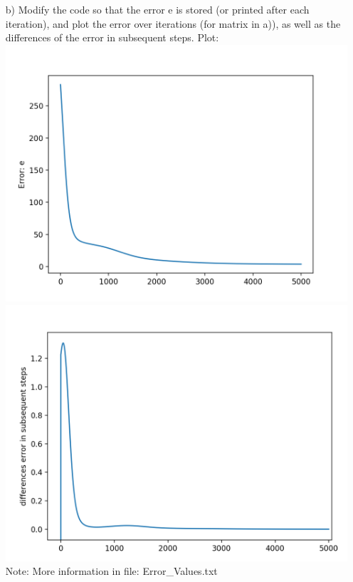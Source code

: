 \documentclass[11pt,a4paper]{scrartcl}
\begin{document}
\begin{itemize}
\begin{verbatim}
\end{verbatim}	
	\item [b)] Modify the code so that the error e is stored (or printed after each iteration), and plot the error over iterations (for matrix in a)), as well as the differences of the error in subsequent steps.
	Plot:\\
	\includegraphics[scale=0.5]{Plot_Error}
	\includegraphics[scale=0.5]{DEISS_Zoomed}
	\\
	Note: More information in file: Error\_Values.txt
	

\end{itemize}
\end{document}
